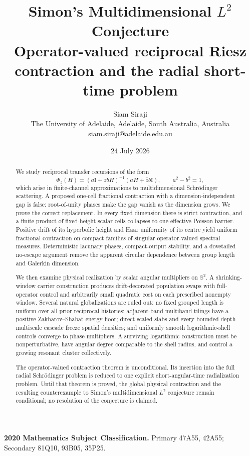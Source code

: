 \documentclass[11pt]{article}
\title{\textbf{Simon's Multidimensional $L^2$ Conjecture}\\[3pt]
\large Operator-valued reciprocal Riesz contraction and the radial short-time problem}
\author{Siam Siraji\\[3pt]
\small The University of Adelaide, Adelaide, South Australia, Australia\\
\small \href{mailto:siam.siraji@adelaide.edu.au}{siam.siraji@adelaide.edu.au}}
\date{24 July 2026}
\theoremstyle{remark}
\newcommand{\Id}{\mathrm I}
\begin{document}
\maketitle

\begin{abstract}
We study reciprocal transfer recursions of the form
\[
 \Phi_z(H)=(a\Id+zbH)^{-1}(aH+\bar z b\Id),
 \qquad a^2-b^2=1,
\]
which arise in finite-channel approximations to multidimensional
Schr\"odinger scattering.  A proposed one-cell fractional contraction with a
dimension-independent gap is false: root-of-unity phases make the gap vanish
as the dimension grows.  We prove the correct replacement.  In every fixed
dimension there is strict contraction, and a finite product of fixed-height
scalar cells collapses to one effective Poisson barrier.  Positive drift of
its hyperbolic height and Haar uniformity of its centre yield uniform
fractional contraction on compact families of singular operator-valued
spectral measures.  Deterministic lacunary phases, compact-output stability,
and a dovetailed no-escape argument remove the apparent circular dependence
between group length and Galerkin dimension.

We then examine physical realization by scalar angular multipliers on
\(\mathbb S^2\).  A shrinking-window carrier construction produces
drift-decorated population swaps with full-operator control and arbitrarily
small quadratic cost on each prescribed nonempty window.  Several natural
globalizations are ruled out: no fixed grouped length is uniform over all
prior reciprocal histories; adjacent-band multiband tilings have a positive
Zakharov--Shabat energy floor; direct scaled slabs and every bounded-depth
multiscale cascade freeze spatial densities; and uniformly smooth
logarithmic-shell controls converge to phase multipliers.  A surviving
logarithmic construction must be nonperturbative, have angular degree
comparable to the shell radius, and control a growing resonant cluster
collectively.

The operator-valued contraction theorem is unconditional.  Its insertion
into the full radial Schr\"odinger problem is reduced to one explicit
short-angular-time radialization problem.  Until that theorem is proved, the
global physical contraction and the resulting counterexample to Simon's
multidimensional \(L^2\) conjecture remain conditional; no resolution of the
conjecture is claimed.
\end{abstract}

\noindent\textbf{2020 Mathematics Subject Classification.}
Primary 47A55, 42A55; Secondary 81Q10, 93B05, 35P25.
\end{document}
